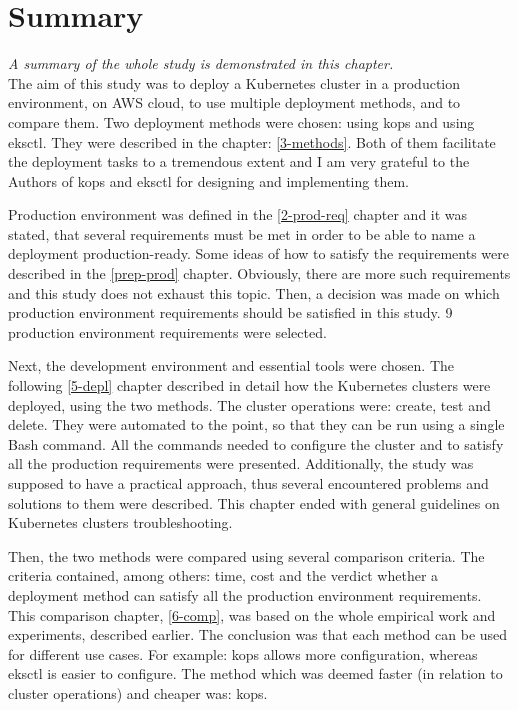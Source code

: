 \section{Summary}
\textit{A summary of the whole study is demonstrated in this chapter.}
\\

The aim of this study was to deploy a Kubernetes cluster in a production environment, on AWS cloud, to use multiple deployment methods, and to compare them. Two deployment methods were chosen: using kops and using eksctl. They were described in the chapter: \ref{3-methods}. Both of them facilitate the deployment tasks to a tremendous extent and I am very grateful to the Authors of kops and eksctl for designing and implementing them.

Production environment was defined in the \ref{2-prod-req} chapter and it was stated, that several requirements must be met in order to be able to name a deployment production-ready. Some ideas of how to satisfy the requirements were described in the \ref{prep-prod} chapter. Obviously, there are more such requirements and this study does not exhaust this topic. Then, a decision was made on which production environment requirements should be satisfied in this study. 9 production environment requirements were selected.

Next, the development environment and essential tools were chosen. The following \ref{5-depl} chapter described in detail how the Kubernetes clusters were deployed, using the two methods. The cluster operations were: create, test and delete. They were automated to the point, so that they can be run using a single Bash command. All the commands needed to configure the cluster and to satisfy all the production requirements were presented. Additionally, the study was supposed to have a practical approach, thus several encountered problems and solutions to them were described. This chapter ended with general guidelines on Kubernetes clusters troubleshooting.

Then, the two methods were compared using several comparison criteria. The criteria contained, among others: time, cost and the verdict whether a deployment method can satisfy all the production environment requirements. This comparison chapter, \ref{6-comp}, was based on the whole empirical work and experiments, described earlier. The conclusion was that each method can be used for different use cases. For example: kops allows more configuration, whereas eksctl is easier to configure. The method which was deemed faster (in relation to cluster operations) and cheaper was: kops.

